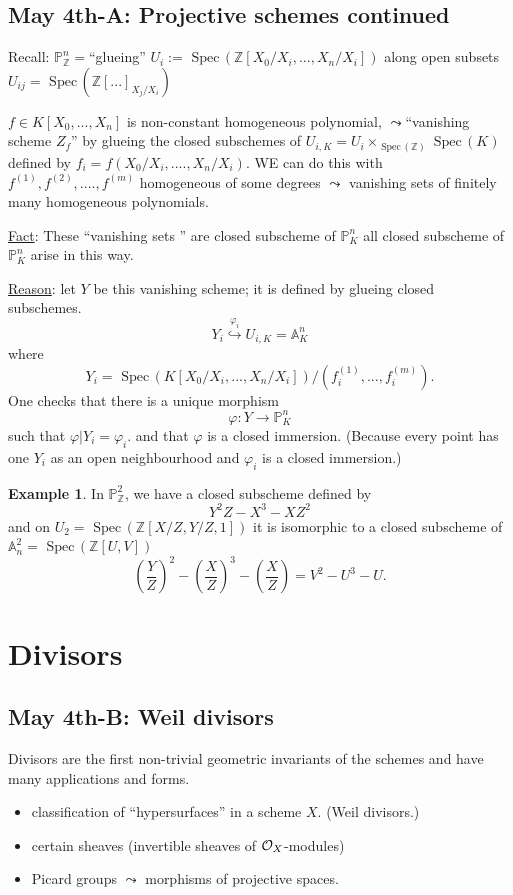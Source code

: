 \documentclass[11pt]{article}
\theoremstyle{definition}
\newtheorem{ex}[thm]{Example}
\newcommand{\spec}{\text{ Spec}\,}
\newcommand{\affn}{\mathbb A}
\newcommand{\proj}{\mathbb P}
\newcommand{\intg}{\mathbb Z}
\newcommand{\calo}{{\cal O}}
\newcommand{\lrta}{\longrightarrow}
\newcommand{\inj}{\hookrightarrow}
\begin{document}
\subsection{May 4th-A: Projective schemes continued}
Recall: $\proj^n_\intg=$``glueing'' $U_i:=\spec(\intg[
X_0/X_i,..., X_n/X_i])$ along open subsets $U_{ij}=\spec(\intg[...]_{X_j/X_i})$

$f\in K[X_0,...,X_n]$ is non-constant homogeneous polynomial, $\leadsto$``vanishing scheme $Z_f$'' by  glueing the closed subschemes of $U_{i,K}=U_i\times_{\spec(\intg)}\spec (K)$ defined by $f_i=f(X_0/X_i,....,X_n/X_i)$. WE can do this with $f^{(1)},f^{(2)},....,f^{(m)}$ homogeneous of some degrees $\leadsto $ vanishing sets of finitely many homogeneous polynomials.

\underline{Fact}: These ``vanishing sets '' are closed subscheme of $\proj^n_K$ all closed subscheme of $\proj^n_K$ arise in this way.

\underline{Reason}: let $Y$ be this vanishing scheme; it is defined by glueing closed subschemes.
$$
Y_i\overset{\varphi_i}{\inj} U_{i,K}=\affn^n_K
$$
where 
$$
Y_i=\spec(K[X_0/X_i,...,X_n/X_i])/(f_i^{(1)},...,f_i^{(m)}).  
$$
One checks that there is a unique morphism
$$
\varphi:Y\lrta \proj^n_K
$$
such that  $\varphi|Y_i=\varphi_i$. and that $\varphi$ is a closed immersion. (Because every point has one $Y_i$ as an open neighbourhood
and $\varphi_i$ is a closed immersion.)

\begin{ex}
In $\proj^2_\intg$, we have a closed subscheme defined by 
$$
Y^2Z-X^3-XZ^2
$$
and on $U_2=\spec(\intg[X/Z,Y/Z,1])$ it is isomorphic to a closed subscheme of $\affn^2_n=\spec(\intg[U,V])$
$$
\left(\frac{Y}{Z}\right)^2-\left(\frac{X}{Z}\right)^3-\left(\frac{X}{Z}\right)=V^2-U^3-U.
$$
\end{ex}


\section{Divisors}
\subsection{May 4th-B: Weil divisors}
Divisors are the first non-trivial geometric invariants of the schemes and have many applications and forms.
\begin{itemize}
	\item classification of ``hypersurfaces'' in a scheme $X$. (Weil divisors.)
	\item certain sheaves (invertible sheaves of $\calo_X$-modules)
	\item Picard groups $\leadsto$ morphisms of projective spaces.
\end{itemize}
\end{document}
